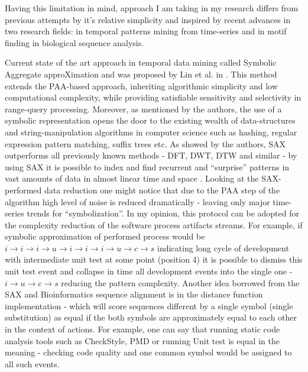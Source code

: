 \documentclass{sig-alternate}
\begin{document}
Having this limitation in mind, approach I am taking in my research differs from previous attempts by it's relative simplicity and inspired by recent advances in two research fields: in temporal patterns mining from time-series and in motif finding in biological sequence analysis. 

Current state of the art approach in temporal data mining called Symbolic Aggregate approXimation and was proposed by Lin et al. in \cite{citeulike:2821475}. This method extends the PAA-based approach, inheriting algorithmic simplicity and low computational complexity, while providing satisfiable sensitivity and selectivity in range-query processing. Moreover, as mentioned by the authors, the use of a symbolic representation opens the door to the existing wealth of data-structures and string-manipulation algorithms in computer science such as hashing, regular expression pattern matching, suffix trees etc. As showed by the authors, SAX outperforms all previously known methods - DFT, DWT, DTW and similar - by using SAX it is possible to index and find recurrent and ``surprise'' patterns in vast amounts of data in almost linear time and space \cite{citeulike:1630245} \cite{citeulike:3025877} \cite{citeulike:3000416}. Looking at the SAX-performed data reduction one might notice that due to the PAA step of the algorithm high level of noise is reduced dramatically - leaving only major time-series trends for ``symbolization''. In my opinion, this protocol can be adopted for the complexity reduction of the software process artifacts streams. For example, if symbolic approximation of performed process would be $i \rightarrow i \rightarrow i \rightarrow u \rightarrow i \rightarrow i \rightarrow i \rightarrow u \rightarrow c \rightarrow s $ indicating long cycle of development with intermediate unit test at some point (position 4) it is possible to dismiss this unit test event and collapse in time all development events into the single one - $i \rightarrow u \rightarrow c \rightarrow s $ reducing the pattern complexity. Another idea borrowed from the SAX and Bioinformatics sequence alignment is in the distance function implementation - which will score sequences different by a single symbol (single substitution) as equal if the both symbols are approximately equal to each other in the context of actions. For example, one can say that running static code analysis tools such as CheckStyle, PMD or running Unit test is equal in the meaning - checking code quality and one common symbol would be assigned to all such events.
\end{document}
